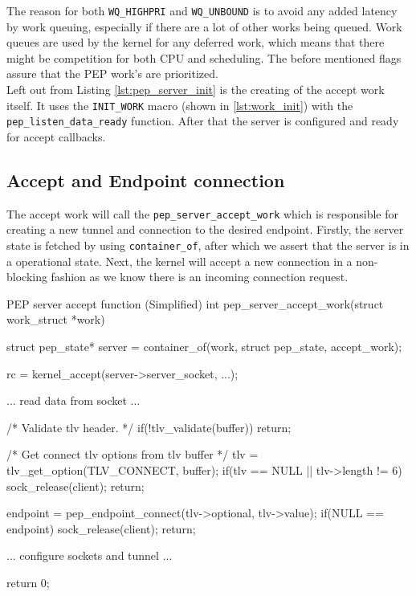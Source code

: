 \documentclass[a4paper,english, 12pt]{report}
\begin{document}
The reason for both \verb|WQ_HIGHPRI| and \verb|WQ_UNBOUND| is to avoid any added latency by work queuing, especially if there are a lot of other works being queued. Work queues are used by the kernel for any deferred work, which means that there might be competition for both CPU and scheduling. The before mentioned flags assure that the PEP work's are prioritized.\\

Left out from Listing \ref{lst:pep_server_init} is the creating of the accept work itself. It uses the \verb|INIT_WORK| macro (shown in \ref{lst:work_init}) with the \verb|pep_listen_data_ready| function. After that the server is configured and ready for accept callbacks.

\subsection{Accept and Endpoint connection}
The accept work will call the \verb|pep_server_accept_work| which is responsible for creating a new tunnel and connection to the desired endpoint. Firstly, the server state is fetched by using \verb|container_of|, after which we assert that the server is in a operational state. Next, the kernel will accept a new connection in a non-blocking fashion as we know there is an incoming connection request.\\

\begin{autonumlstlisting}[label=lst:pep_server_accept]{PEP server accept function (Simplified)}
int pep_server_accept_work(struct work_struct *work)
{
    struct pep_state* server = container_of(work, struct pep_state, accept_work);

    rc = kernel_accept(server->server_socket, ...);
    
    ... read data from socket ...

    /* Validate tlv header. */
    if(!tlv_validate(buffer)){
        return;
    }
    
    /* Get connect tlv options from tlv buffer */
    tlv = tlv_get_option(TLV_CONNECT, buffer);
    if(tlv == NULL || tlv->length != 6){
        sock_release(client);
        return; 
    }

    endpoint = pep_endpoint_connect(tlv->optional, tlv->value);
    if(NULL == endpoint){
        sock_release(client);
        return; 
    }
    
    ... configure sockets and tunnel ...
    
    return 0;
}
\end{autonumlstlisting}
\end{document}
